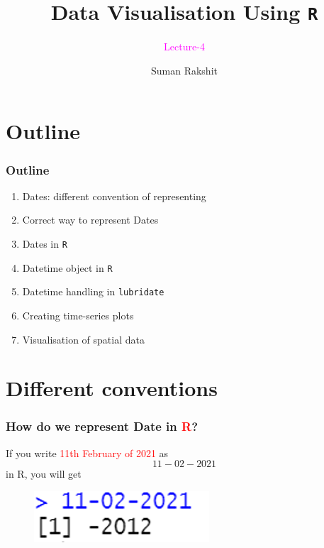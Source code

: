 \documentclass{beamer}
\title[]{Data Visualisation Using \texttt{R}}
\subtitle{\textcolor{magenta}{Lecture-4}}
\author[]{Suman Rakshit} %
\institute[School of EECMS, Curtin University] %
{
	\textcolor{magenta}{School of EECMS, Curtin University} %
}
\begin{document}
\begin{frame}
	\titlepage %
\end{frame}







\section{Outline}
\begin{frame}[t]\frametitle{Outline}
\begin{enumerate}
\item Dates: different convention of representing
\item Correct way to represent Dates
\item Dates in \texttt{R}
\item Datetime object in \texttt{R}
\item Datetime handling in \texttt{lubridate}
\item Creating time-series plots
\item Visualisation of spatial data
\end{enumerate}
\end{frame}



\section{Different conventions}
\begin{frame}\frametitle{How do we represent Date in \textcolor{red}{\textsf{R}}?}
If you write \textcolor{red}{11th February of 2021} as $$11-02-2021$$ in \textsf{R},
you will get
\begin{figure}
\includegraphics[width=0.50\linewidth]{PlotsLec4/DateAsNumber}
\end{figure}
\end{frame}
\end{document}
